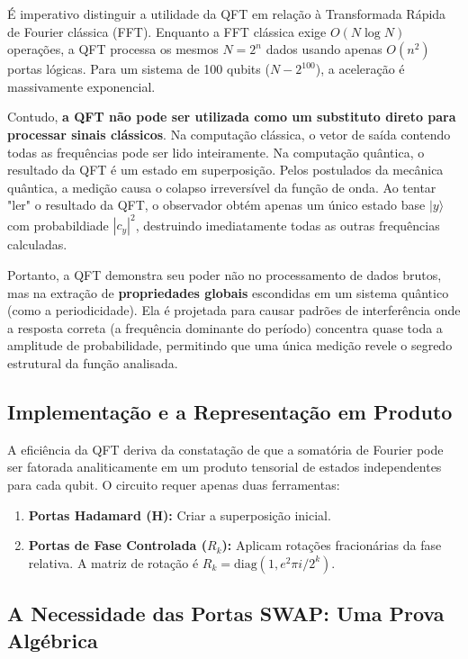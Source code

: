 \documentclass[12pt, a4paper]{article}
\newcommand{\ket}[1]{\lvert #1 \rangle}
\begin{document}
É imperativo distinguir a utilidade da QFT em relação à Transformada Rápida de Fourier clássica (FFT). Enquanto a FFT clássica exige $O(N \log N)$ operações, a QFT processa os mesmos $N = 2^n$ dados usando apenas $O(n^2)$ portas lógicas. Para um sistema de 100 qubits ($N - 2^{100}$), a aceleração é massivamente exponencial.

Contudo, \textbf{a QFT não pode ser utilizada como um substituto direto para processar sinais clássicos}. Na computação clássica, o vetor de saída contendo todas as frequências pode ser lido inteiramente. Na computação quântica, o resultado da QFT é um estado em superposição. Pelos postulados da mecânica quântica, a medição causa o colapso irreversível da função de onda. Ao tentar "ler" o resultado da QFT, o observador obtém apenas um único estado base $\ket{y}$ com probabildiade $|c_y|^2$, destruindo imediatamente todas as outras frequências calculadas.

Portanto, a QFT demonstra seu poder não no processamento de dados brutos, mas na extração de \textbf{propriedades globais} escondidas em um sistema quântico (como a periodicidade). Ela é projetada para causar padrões de interferência onde a resposta correta (a frequência dominante do período) concentra quase toda a amplitude de probabilidade, permitindo que uma única medição revele o segredo estrutural da função analisada. 

\subsection{Implementação e a Representação em Produto}

A eficiência da QFT deriva da constatação de que a somatória de Fourier pode ser fatorada analiticamente em um produto tensorial de estados independentes para cada qubit. O circuito requer apenas duas ferramentas:
\begin{enumerate}
    \item \textbf{Portas Hadamard (H):} Criar a superposição inicial.
    \item \textbf{Portas de Fase Controlada ($R_k$):} Aplicam rotações fracionárias da fase relativa. A matriz de rotação é $R_k = \text{diag}(1, e^2\pi i / 2^k)$.
\end{enumerate}

\subsection{A Necessidade das Portas SWAP: Uma Prova Algébrica} 
\end{document}
